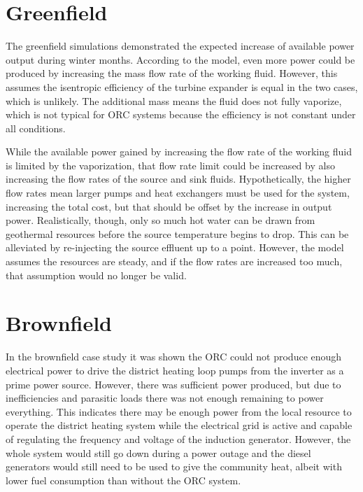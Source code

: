 \section{Greenfield}
The greenfield simulations demonstrated the expected increase of available power output during winter months. 
According to the model, even more power could be produced by increasing the mass flow rate of the working fluid. However, this assumes the isentropic efficiency of the turbine expander is equal in the two cases, which is unlikely. The additional mass means the fluid does not fully vaporize, which is not typical for ORC systems because the efficiency is not constant under all conditions. 

While the available power gained by increasing the flow rate of the working fluid is limited by the vaporization, that flow rate limit could be increased by also increasing the flow rates of the source and sink fluids. Hypothetically, the higher flow rates mean larger pumps and heat exchangers must be used for the system, increasing the total cost, but that should be offset by the increase in output power. Realistically, though, only so much hot water can be drawn from geothermal resources before the source temperature begins to drop. This can be alleviated by re-injecting the source effluent up to a point. However, the model assumes the resources are steady, and if the flow rates are increased too much, that assumption would no longer be valid.


\section{Brownfield}
In the brownfield case study it was shown the ORC could not produce enough electrical power to drive the district heating loop pumps from the inverter as a prime power source.
However, there was sufficient power produced, but due to inefficiencies and parasitic loads there was not enough remaining to power everything. 
This indicates there may be enough power from the local resource to operate the district heating system while the electrical grid is active and capable of regulating the frequency and voltage of the induction generator. However, the whole system would still go down during a power outage and the diesel generators would still need to be used to give the community heat, albeit with lower fuel consumption than without the ORC system.

